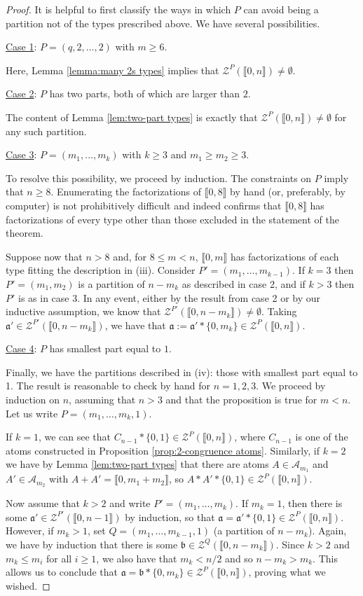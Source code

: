 \documentclass{report}
\newcommand{\A}{\mathscr{A}}
\renewcommand{\aa}{\mathfrak{a}}
\newcommand{\bb}{\mathfrak{b}}
\newcommand{\Z}{\mathcal{Z}}
\newcommand{\llb}{\llbracket}
\newcommand{\rrb}{\rrbracket}
\renewcommand{\:}{\text{:}}
\theoremstyle{definition}
\begin{document}
\begin{proof}
It is helpful to first classify the ways in which $P$ can avoid being a partition not of the types prescribed above.  
We have several possibilities.


\underline{Case 1}: $P = (q,2,\dots, 2)$ with $m\ge 6$.

Here, Lemma \ref{lemma:many 2s types} implies that $\Z^P(\llb 0,n \rrb) \neq \emptyset$.

\underline{Case 2}: $P$ has two parts, both of which are larger than $2$.

The content of Lemma \ref{lem:two-part types} is exactly that $\Z^P(\llb 0,n \rrb) \neq \emptyset$ for any such partition.

\underline{Case 3}: $P = (m_1,\dots, m_k)$ with $k\ge 3$ and $m_1\ge m_2 \ge 3$.

To resolve this possibility, we proceed by induction.
The constraints on $P$ imply that $n\ge 8$.  
Enumerating the factorizations of $\llb 0,8 \rrb$ by hand (or, preferably, by computer) is not prohibitively difficult and indeed confirms that $\llb 0,8 \rrb$ has factorizations of every type other than those excluded in the statement of the theorem.

Suppose now that $n > 8$ and, for $8\le m < n$, $\llb 0,m \rrb$ has factorizations of each type fitting the description in (iii).
Consider $P' = (m_1,\dots, m_{k-1})$.
If $k=3$ then $P'=(m_1,m_2)$ is a partition of $n-m_k$ as described in case 2, and if $k>3$ then $P'$ is as in case 3.  
In any event, either by the result from case 2 or by our inductive assumption, we know that $\Z^{P'}(\llb 0,n-m_k \rrb) \neq \emptyset$.
Taking $\aa' \in \Z^{P'}(\llb 0,n-m_k \rrb)$, we have that $\aa := \aa' * \{0,m_k\} \in \Z^P(\llb 0,n \rrb)$.

\underline{Case 4}: $P$ has smallest part equal to $1$.

Finally, we have the partitions described in (iv): those with smallest part equal to 1.
The result is reasonable to check by hand for $n=1,2,3$.
We proceed by induction on $n$, assuming that $n>3$ and that the proposition is true for $m<n$.
Let us write $P = (m_1,\dots, m_k, 1)$.

If $k=1$, we can see that $C_{n-1}*\{0,1\}\in \Z^P(\llb 0,n \rrb)$, where $C_{n-1}$ is one of the atoms constructed in Proposition \ref{prop:2-congruence atoms}.
Similarly, if $k=2$ we have by Lemma \ref{lem:two-part types} that there are atoms $A\in \A_{m_1}$ and $A'\in \A_{m_2}$ with $A+A' = \llb 0,m_1+m_2 \rrb$, so $A*A'* \{0,1\}\in \Z^P(\llb 0,n \rrb)$.

Now assume that $k>2$ and write $P' = (m_1,\dots, m_k)$.
If $m_k=1$, then there is some $\aa'\in \Z^{P'}(\llb 0,n-1 \rrb)$ by induction, so that $\aa = \aa' * \{0,1\}\in \Z^P(\llb 0,n \rrb)$.
However, if $m_k > 1$, set $Q = (m_1,\dots, m_{k-1}, 1)$ (a partition of $n-m_k$).
Again, we have by induction that there is some $\bb \in \Z^Q(\llb 0, n-m_k \rrb)$.
Since $k>2$ and $m_k \le m_i$ for all $i\ge 1$, we also have that $m_k < n/2$ and so $n-m_k > m_k$.
This allows us to conclude that $\aa = \bb * \{0,m_k\} \in \Z^P(\llb 0,n \rrb)$, proving what we wished.
\end{proof}
\end{document}
